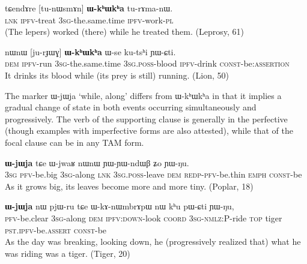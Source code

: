 \documentclass[oldfontcommands,oneside,a4paper,11pt]{article}
\newcommand{\ipa}[1]{{\phon \mbox{#1}}} %
\begin{document}
\begin{exe}
\ex \label{ex:WkhWkha1}
\gll
\ipa{tɕendɤre}  	[\ipa{tu-nɯsmɤn}]  	\textbf{\ipa{ɯ-kʰɯkʰa}}  	\ipa{tu-rɤma-nɯ.}  \\
\textsc{lnk} \textsc{ipfv}-treat \textsc{3sg}-the.same.time \textsc{ipfv}-work-\textsc{pl} \\
\glt (The lepers) worked (there) while he treated them. (Leprosy, 61)
\end{exe}
\begin{exe}
\ex \label{ex:WkhWkha2}
\gll
\ipa{nɯnɯ}  	[\ipa{ju-rɟɯɣ}]  	\textbf{\ipa{ɯ-kʰɯkʰa}}  	\ipa{ɯ-se}  	\ipa{ku-tsʰi}  	\ipa{ɲɯ-ɕti.}  \\
\textsc{dem} \textsc{ipfv}-run \textsc{3sg}-the.same.time \textsc{3sg.poss}-blood \textsc{ipfv}-drink  \textsc{const}-be:\textsc{assertion} \\
\glt It drinks its blood while (its prey is still) running. (Lion, 50)
\end{exe}



The marker \ipa{ɯ-jɯja} `while, along'  differs from \ipa{ɯ-kʰɯkʰa} in that it implies a gradual change of state in both events occurring simultaneously and progressively. The verb of the supporting clause is generally in the perfective (though examples with imperfective forms are also attested), while that of the focal clause can be in any TAM form.


\begin{exe}
\ex \label{ex:WjWja1}
\gll
[\ipa{ɯʑo}  	\ipa{tɤ-wxti}]  	\textbf{\ipa{ɯ-jɯja}}  	\ipa{tɕe}  	\ipa{ɯ-jwaʁ}  	\ipa{nɯnɯ}  	\ipa{ɲɯ-ɲɯ-ndɯβ}  	\ipa{ʑo}  	\ipa{ɲɯ-ŋu.}  	\\
\textsc{3sg} \textsc{pfv}-be.big  \textsc{3sg}-along \textsc{lnk} \textsc{3sg.poss}-leave \textsc{dem} \textsc{redp-pfv}-be.thin \textsc{emph} \textsc{const}-be \\
\glt As it grows big, its leaves become more and more tiny. (Poplar, 18)
\end{exe}

     \begin{exe}
   \ex \label{ex:khu}
   \gll  [\ipa{lɤ-fsoʁ}]  	\textbf{\ipa{ɯ-jɯja}}  	\ipa{nɯ}  	\ipa{pjɯ-ru}  	\ipa{tɕe}  	\ipa{ɯ-kɤ-nɯmbrɤpɯ}  	\ipa{nɯ}  	\ipa{kʰu}  	\ipa{pɯ-ɕti}  	\ipa{ɲɯ-ŋu,}  \\
\textsc{pfv}-be.clear    \textsc{3sg}-along  \textsc{dem} \textsc{ipfv:down}-look \textsc{coord} \textsc{3sg-nmlz:P}-ride \textsc{top} tiger \textsc{pst.ipfv}-be.\textsc{assert}  \textsc{const}-be \\
\glt As the day was breaking, looking down, he (progressively realized that) what he was riding was a tiger. (Tiger, 20)
\end{exe}
\end{document}
